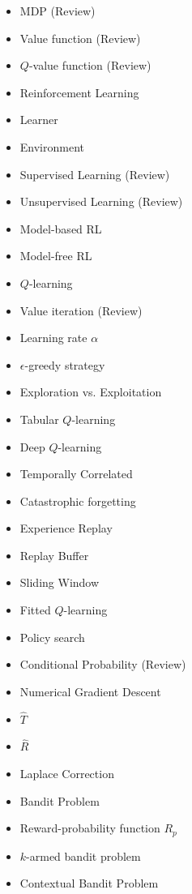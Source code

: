     \begin{itemize}
        \item MDP (Review)
        \item Value function (Review)
        \item $Q$-value function (Review)
        \item Reinforcement Learning
        \item Learner
        \item Environment
        \item Supervised Learning (Review)
        \item Unsupervised Learning (Review)
        \item Model-based RL
        \item Model-free RL
        \item $Q$-learning
        \item Value iteration (Review)
        \item Learning rate $\alpha$
        \item $\epsilon$-greedy strategy
        \item Exploration vs. Exploitation
        \item Tabular $Q$-learning
        \item Deep $Q$-learning
        \item Temporally Correlated
        \item Catastrophic forgetting
        \item Experience Replay
        \item Replay Buffer
        \item Sliding Window
        \item Fitted $Q$-learning
        \item Policy search
        \item Conditional Probability (Review)
        \item Numerical Gradient Descent
        \item $\widehat{T}$
        \item $\widehat{R}$
        \item Laplace Correction
        \item Bandit Problem
        \item Reward-probability function $R_p$
        \item $k$-armed bandit problem
        \item Contextual Bandit Problem
    \end{itemize}

        

    

    
    

    

    

    

        

    



        

        
